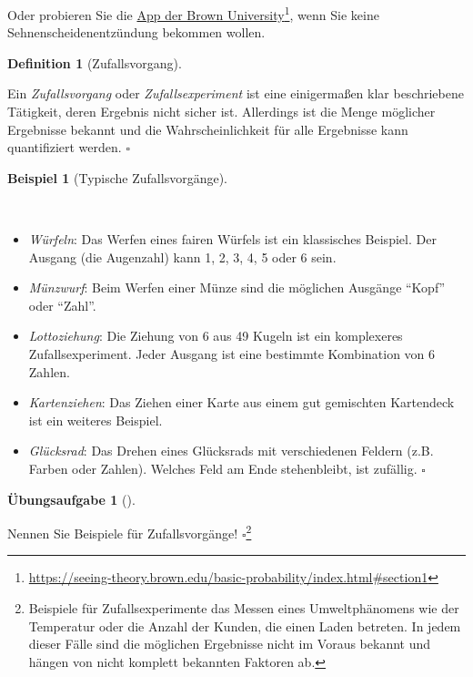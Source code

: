 \documentclass[
  ngerman,
  letterpaper,
  twoside,
  open=any]{scrbook}
\providecommand{\tightlist}{%
  \setlength{\itemsep}{0pt}\setlength{\parskip}{0pt}}\usepackage{longtable,booktabs,array}
\theoremstyle{definition}
\newtheorem{example}{Beispiel}[chapter]
\theoremstyle{plain}
\theoremstyle{definition}
\newtheorem{exercise}{Übungsaufgabe}[chapter]
\theoremstyle{definition}
\newtheorem{definition}{Definition}[chapter]
\theoremstyle{remark}
\begin{document}
Oder probieren Sie die
\href{https://seeing-theory.brown.edu/basic-probability/index.html\#section1}{App
der Brown University}\footnote{\url{https://seeing-theory.brown.edu/basic-probability/index.html\#section1}},
wenn Sie keine Sehnenscheidenentzündung bekommen wollen.

\begin{definition}[Zufallsvorgang]\protect\hypertarget{def-zufallsvorgang}{}\label{def-zufallsvorgang}

Ein \emph{Zufallsvorgang} oder \emph{Zufallsexperiment} ist eine
einigermaßen klar beschriebene Tätigkeit, deren Ergebnis nicht sicher
ist. Allerdings ist die Menge möglicher Ergebnisse bekannt und die
Wahrscheinlichkeit für alle Ergebnisse kann quantifiziert werden.
\(\square\)

\end{definition}

\begin{example}[Typische
Zufallsvorgänge]\protect\hypertarget{exm-zufallsvorgang}{}\label{exm-zufallsvorgang}

~

\begin{itemize}
\tightlist
\item
  \emph{Würfeln}: Das Werfen eines fairen Würfels ist ein klassisches
  Beispiel. Der Ausgang (die Augenzahl) kann 1, 2, 3, 4, 5 oder 6 sein.
\item
  \emph{Münzwurf}: Beim Werfen einer Münze sind die möglichen Ausgänge
  \enquote{Kopf} oder \enquote{Zahl}.
\item
  \emph{Lottoziehung}: Die Ziehung von 6 aus 49 Kugeln ist ein
  komplexeres Zufallsexperiment. Jeder Ausgang ist eine bestimmte
  Kombination von 6 Zahlen.
\item
  \emph{Kartenziehen}: Das Ziehen einer Karte aus einem gut gemischten
  Kartendeck ist ein weiteres Beispiel.
\item
  \emph{Glücksrad}: Das Drehen eines Glücksrads mit verschiedenen
  Feldern (z.B. Farben oder Zahlen). Welches Feld am Ende stehenbleibt,
  ist zufällig. \(\square\)
\end{itemize}

\end{example}

\begin{exercise}[]\protect\hypertarget{exr-zufall2}{}\label{exr-zufall2}

Nennen Sie Beispiele für Zufallsvorgänge! \(\square\)\footnote{Beispiele
  für Zufallsexperimente das Messen eines Umweltphänomens wie der
  Temperatur oder die Anzahl der Kunden, die einen Laden betreten. In
  jedem dieser Fälle sind die möglichen Ergebnisse nicht im Voraus
  bekannt und hängen von nicht komplett bekannten Faktoren ab.}

\end{exercise}
\end{document}
